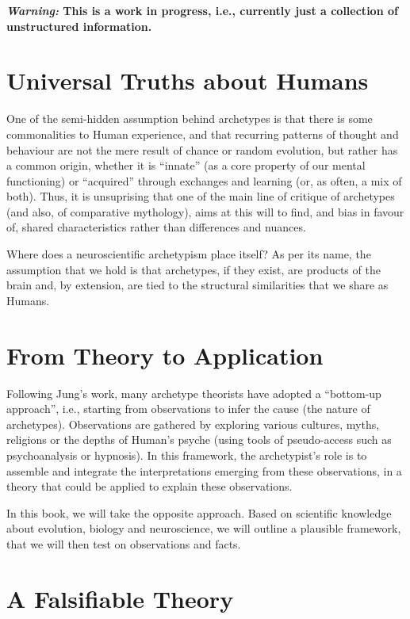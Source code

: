 \documentclass[
]{book}
\begin{document}
\textbf{\emph{Warning:} This is a work in progress, i.e., currently just a collection of unstructured information.}

\hypertarget{universal-truths-about-humans}{%
\section{Universal Truths about Humans}\label{universal-truths-about-humans}}

One of the semi-hidden assumption behind archetypes is that there is some commonalities to Human experience, and that recurring patterns of thought and behaviour are not the mere result of chance or random evolution, but rather has a common origin, whether it is ``innate'' (as a core property of our mental functioning) or ``acquired'' through exchanges and learning (or, as often, a mix of both). Thus, it is unsuprising that one of the main line of critique of archetypes (and also, of comparative mythology), aims at this will to find, and bias in favour of, shared characteristics rather than differences and nuances.

Where does a neuroscientific archetypism place itself? As per its name, the assumption that we hold is that archetypes, if they exist, are products of the brain and, by extension, are tied to the structural similarities that we share as Humans.

\hypertarget{from-theory-to-application}{%
\section{From Theory to Application}\label{from-theory-to-application}}

Following Jung's work, many archetype theorists have adopted a ``bottom-up approach'', i.e., starting from observations to infer the cause (the nature of archetypes). Observations are gathered by exploring various cultures, myths, religions or the depths of Human's psyche (using tools of pseudo-access such as psychoanalysis or hypnosis). In this framework, the archetypist's role is to assemble and integrate the interpretations emerging from these observations, in a theory that could be applied to explain these observations.

In this book, we will take the opposite approach. Based on scientific knowledge about evolution, biology and neuroscience, we will outline a plausible framework, that we will then test on observations and facts.

\hypertarget{a-falsifiable-theory}{%
\section{A Falsifiable Theory}\label{a-falsifiable-theory}}
\end{document}

